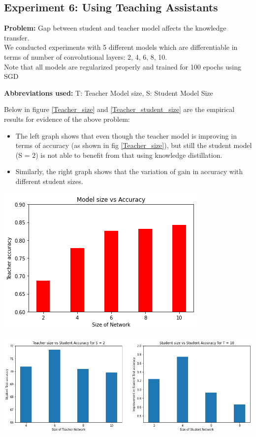 \documentclass{article} %
\begin{document}
	\subsection{Experiment 6: Using Teaching Assistants}
	\textbf{Problem:} Gap between student and teacher model affects the knowledge transfer. \\
	We conducted experiments with 5 different models which are differentiable in terms of number of convolutional layers: 2, 4, 6, 8, 10.\\
	Note that all models are regularized properly and trained for 100 epochs using SGD
	
	\textbf{Abbreviations used: } T: Teacher Model size, S: Student Model Size
	
	Below in figure \ref{Teacher_size} and \ref{Teacher_student_size} are the empirical results for evidence of the above problem:
	\begin{itemize}
		\item The left graph shows that even though the teacher model is improving in terms of accuracy (as shown in fig \ref{Teacher_size}), but still the student model (S = 2) is not able to benefit from that using knowledge distillation.
		
		\item Similarly, the right graph shows that the variation of gain in accuracy with different student sizes.
	\end{itemize}
	
	\newpage
	\begin{center}
		\includegraphics[width=0.6\linewidth]{fig/kd_13.png}
		\label{Teacher_size}		
	\end{center}
	
	\begin{center}
		\includegraphics[width=\linewidth]{fig/kd_14.png}
		\label{Teacher_student_size}
	\end{center}
	
\end{document}
